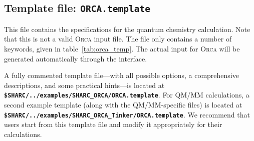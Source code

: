 \documentclass[a4paper,10pt,DIV=15,openany]{scrbook}
\newcommand{\ttt}[1]{\textbf{\texttt{#1}}}
\begin{document}
\subsection{Template file: \ttt{ORCA.template}}

This file contains the specifications for the quantum chemistry calculation. Note that this is not a valid \textsc{Orca} input file. The file only contains a number of keywords, given in table~\ref{tab:orca_temp}. The actual input for \textsc{Orca} will be generated automatically through the interface.

A fully commented template file---with all possible options, a comprehensive descriptions, and some practical hints---is located at \ttt{\$SHARC/../examples/SHARC\_ORCA/ORCA.template}.
For QM/MM calculations, a second example template (along with the QM/MM-specific files) is located at \ttt{\$SHARC/../examples/SHARC\_ORCA\_Tinker/ORCA.template}.
We recommend that users start from this template file and modify it appropriately for their calculations.
\end{document}

